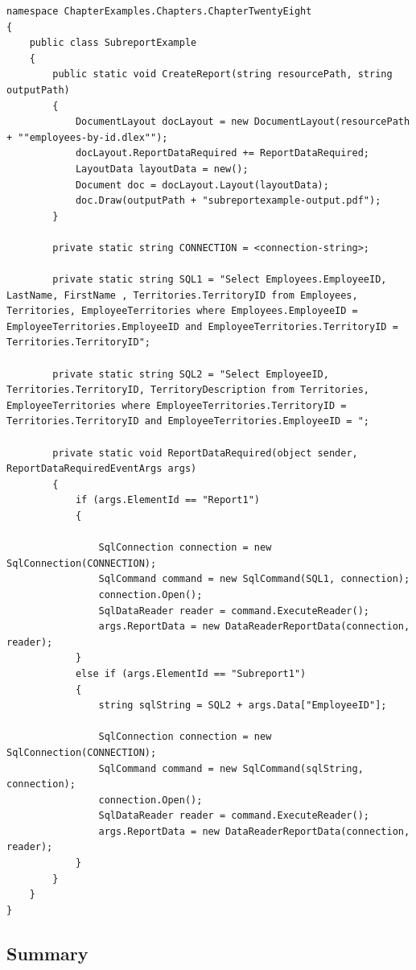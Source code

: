 \documentclass[american]{tufte-book}
\numberwithin{equation}{section}
\numberwithin{figure}{section}
\begin{document}
{{\begin{lstlisting}[caption={Report with subreport.},label={lis:Report-with-subreport.},basicstyle={\footnotesize\ttfamily},breaklines=true]
namespace ChapterExamples.Chapters.ChapterTwentyEight
{
    public class SubreportExample
    {
        public static void CreateReport(string resourcePath, string outputPath)
        {
            DocumentLayout docLayout = new DocumentLayout(resourcePath + ""employees-by-id.dlex"");
            docLayout.ReportDataRequired += ReportDataRequired;
            LayoutData layoutData = new();
            Document doc = docLayout.Layout(layoutData);
            doc.Draw(outputPath + "subreportexample-output.pdf");
        }

        private static string CONNECTION = <connection-string>;

        private static string SQL1 = "Select Employees.EmployeeID, LastName, FirstName , Territories.TerritoryID from Employees, Territories, EmployeeTerritories where Employees.EmployeeID = EmployeeTerritories.EmployeeID and EmployeeTerritories.TerritoryID = Territories.TerritoryID";

        private static string SQL2 = "Select EmployeeID, Territories.TerritoryID, TerritoryDescription from Territories, EmployeeTerritories where EmployeeTerritories.TerritoryID = Territories.TerritoryID and EmployeeTerritories.EmployeeID = ";

        private static void ReportDataRequired(object sender, ReportDataRequiredEventArgs args)
        {
            if (args.ElementId == "Report1")
            {

                SqlConnection connection = new SqlConnection(CONNECTION);
                SqlCommand command = new SqlCommand(SQL1, connection);
                connection.Open();
                SqlDataReader reader = command.ExecuteReader();
                args.ReportData = new DataReaderReportData(connection, reader);
            }
            else if (args.ElementId == "Subreport1")
            {
                string sqlString = SQL2 + args.Data["EmployeeID"];

                SqlConnection connection = new SqlConnection(CONNECTION);
                SqlCommand command = new SqlCommand(sqlString, connection);
                connection.Open();
                SqlDataReader reader = command.ExecuteReader();
                args.ReportData = new DataReaderReportData(connection, reader);
            }
        }
    }
}
\end{lstlisting}
\leavevmode\egroup


\subsection{Summary}

}}
\end{document}
